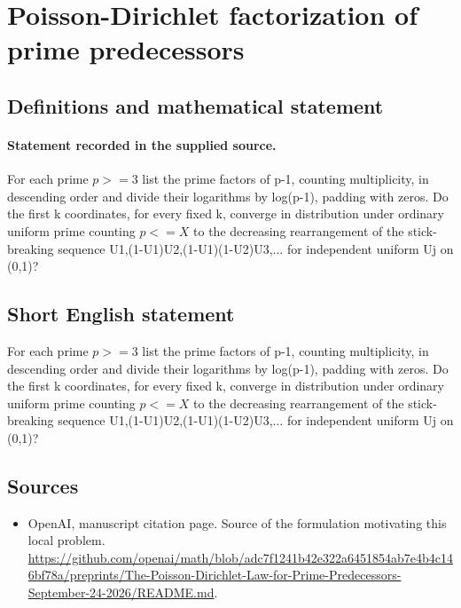 \documentclass[11pt]{article}
\begin{document}
\section*{Poisson-Dirichlet factorization of prime predecessors}\label{30007276}
\subsection{Definitions and mathematical statement}
\paragraph{Statement recorded in the supplied source.}
For each prime $p>=3$ list the prime factors of p-1, counting multiplicity, in descending order and divide their logarithms by log(p-1), padding with zeros. Do the first k coordinates, for every fixed k, converge in distribution under ordinary uniform prime counting $p<=X$ to the decreasing rearrangement of the stick-breaking sequence U1,(1-U1)U2,(1-U1)(1-U2)U3,... for independent uniform Uj on (0,1)?
\subsection{Short English statement}
For each prime $p>=3$ list the prime factors of p-1, counting multiplicity, in descending order and divide their logarithms by log(p-1), padding with zeros. Do the first k coordinates, for every fixed k, converge in distribution under ordinary uniform prime counting $p<=X$ to the decreasing rearrangement of the stick-breaking sequence U1,(1-U1)U2,(1-U1)(1-U2)U3,... for independent uniform Uj on (0,1)?
\subsection{Sources}
\begin{itemize}
\item[S1] OpenAI, manuscript citation page. Source of the formulation motivating this local problem.
\url{https://github.com/openai/math/blob/adc7f1241b42e322a6451854ab7e4b4c146bf78a/preprints/The-Poisson-Dirichlet-Law-for-Prime-Predecessors-September-24-2026/README.md}.
\end{itemize}
\end{document}
